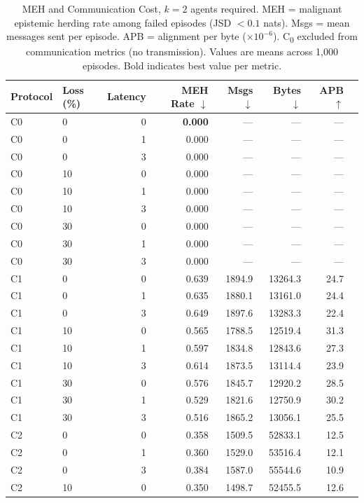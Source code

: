 \documentclass[pdflatex,sn-mathphys-num]{sn-jnl}%
\theoremstyle{thmstyleone}%
\theoremstyle{thmstyletwo}%
\theoremstyle{thmstylethree}%
\begin{document}
\begin{appendices}
\begin{table}
\centering
\caption{MEH and Communication Cost, $k=2$ agents required. MEH = malignant epistemic herding rate among failed episodes (JSD $< 0.1$ nats). Msgs = mean messages sent per episode. APB = alignment per byte ($\times 10^{-6}$). C\textsubscript{0} excluded from communication metrics (no transmission). Values are means across 1,000 episodes. Bold indicates best value per metric.}
\label{tab:appendix_cost_a}
\small
\begin{tabular}{llrrrrrr}
\toprule
Protocol & Loss (\%) & Latency & MEH Rate $\downarrow$ & Msgs $\downarrow$ & Bytes $\downarrow$ & APB $\uparrow$ \\
\midrule
C0 & 0 & 0 & \textbf{0.000} & --- & --- & --- \\
C0 & 0 & 1 & 0.000 & --- & --- & --- \\
C0 & 0 & 3 & 0.000 & --- & --- & --- \\
C0 & 10 & 0 & 0.000 & --- & --- & --- \\
C0 & 10 & 1 & 0.000 & --- & --- & --- \\
C0 & 10 & 3 & 0.000 & --- & --- & --- \\
C0 & 30 & 0 & 0.000 & --- & --- & --- \\
C0 & 30 & 1 & 0.000 & --- & --- & --- \\
C0 & 30 & 3 & 0.000 & --- & --- & --- \\
\addlinespace[4pt]
C1 & 0 & 0 & 0.639 & 1894.9 & 13264.3 & 24.7 \\
C1 & 0 & 1 & 0.635 & 1880.1 & 13161.0 & 24.4 \\
C1 & 0 & 3 & 0.649 & 1897.6 & 13283.3 & 22.4 \\
C1 & 10 & 0 & 0.565 & 1788.5 & 12519.4 & 31.3 \\
C1 & 10 & 1 & 0.597 & 1834.8 & 12843.6 & 27.3 \\
C1 & 10 & 3 & 0.614 & 1873.5 & 13114.4 & 23.9 \\
C1 & 30 & 0 & 0.576 & 1845.7 & 12920.2 & 28.5 \\
C1 & 30 & 1 & 0.529 & 1821.6 & 12750.9 & 30.2 \\
C1 & 30 & 3 & 0.516 & 1865.2 & 13056.1 & 25.5 \\
\addlinespace[4pt]
C2 & 0 & 0 & 0.358 & 1509.5 & 52833.1 & 12.5 \\
C2 & 0 & 1 & 0.360 & 1529.0 & 53516.4 & 12.1 \\
C2 & 0 & 3 & 0.384 & 1587.0 & 55544.6 & 10.9 \\
C2 & 10 & 0 & 0.350 & 1498.7 & 52455.5 & 12.6 \\

\end{tabular}
\end{table}
\end{appendices}
\end{document}
